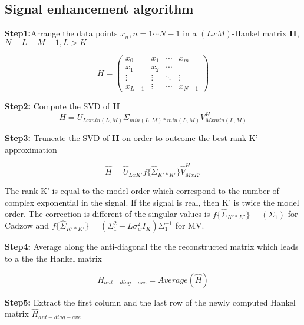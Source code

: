     


\newpage

\subsection{Signal enhancement algorithm}\label{Ap3}  


\textbf{Step1:}Arrange the data points $x_{n},n=1\cdots N-1$ in a $(LxM)$-Hankel matrix \textbf{H}, $N+L+M-1,L>K$ 

\begin{equation}
H= 
 \begin{pmatrix}
  x_{0} & x_{1} & \cdots & x_{m} \\
  x_{1} & x_{2} & \cdots &   \\
  \vdots  & \vdots  & \ddots & \vdots  \\
  x_{L-1} & \vdots & \cdots & x_{N-1} 
 \end{pmatrix}
\end{equation}

 
 \textbf{Step2:} Compute the SVD of \textbf{H}
 \begin{equation}
 H=U_{Lxmin(L,M)}\Sigma_{min(L,M)*min(L,M)}V^{H}_{Mxmin(L,M)}
 \end{equation}
 
 \textbf{Step3:} Truncate the SVD of \textbf{H} on order to outcome the best rank-K' approximation 
 
 \begin{equation}
 \hat{H}=\hat{U}_{LxK'}f\big\{\hat{\Sigma}_{K'*K'}\big\}\hat{V}^{H}_{MxK'}
 \end{equation}
 
 The rank K' is equal to the model order which correspond to the number of complex exponential in the signal. If the signal is real, then K' is twice the model order. The correction is different of the singular values is $f\big\{\hat{\Sigma}_{K'*K'}\big\}=(\Sigma_{1})$  for Cadzow and $f\big\{\hat{\Sigma}_{K'*K'}\big\}=(\Sigma^{2}_{1}-L\sigma^{2}_{w}I_{K})\Sigma_{1}^{-1}$ for MV.
 
\textbf{Step4:} Average along the anti-diagonal the the reconstructed matrix  which leads to a the the Hankel matrix

\begin{equation}
\hat{H}_{ant-diag-ave}=Average(\hat{H})
\end{equation}

\textbf{Step5:} Extract the first column and the last row of the newly computed Hankel matrix $\hat{H}_{ant-diag-ave}$



